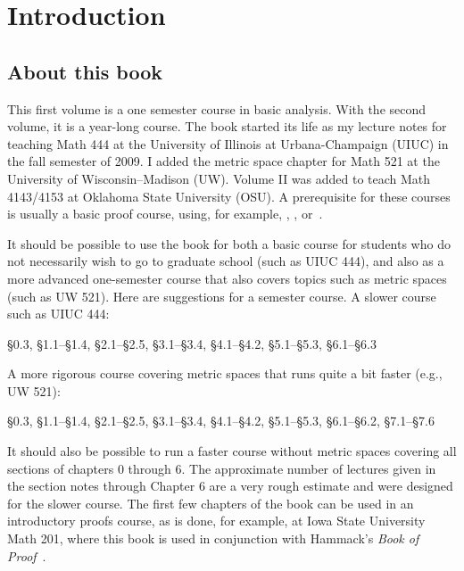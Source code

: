 \chapter*{Introduction}


\section{About this book}

\VolOneIntroExtrahead

This first volume is a one semester course in basic analysis.
With the second volume, it is a year-long course.
The book started its life
as my lecture notes for teaching Math 444 at the
University of Illinois at Urbana-Champaign (UIUC) in the fall semester of 2009.
I added the metric space chapter for Math 521 at the University of
Wisconsin--Madison (UW)\@.
Volume II was added to teach Math 4143/4153 at Oklahoma State University
(OSU)\@.
A prerequisite for these courses is usually a basic proof course,
using, for example, \cite{Hammack}, \cite{GIAM}, or~\cite{DW}.

It should be possible to use the book for
both a basic course for students who do not necessarily wish to
go to graduate school (such as UIUC 444), and also as a more advanced one-semester
course that also covers topics such as metric spaces (such as UW 521).
Here are suggestions for a semester course.
A slower course such as UIUC 444:
\begin{center}
\S0.3, \S1.1--\S1.4, \S2.1--\S2.5, \S3.1--\S3.4, \S4.1--\S4.2,
\S5.1--\S5.3, \S6.1--\S6.3
\end{center}
A more rigorous course covering metric spaces that runs quite a bit faster
(e.g., UW 521):
\begin{center}
\S0.3, \S1.1--\S1.4, \S2.1--\S2.5, \S3.1--\S3.4, \S4.1--\S4.2,
\S5.1--\S5.3, \S6.1--\S6.2, \S7.1--\S7.6
\end{center}
It should also be possible to run a faster course without metric spaces
covering all sections of chapters 0 through 6.  The approximate number of
lectures given in the section notes through Chapter 6 are a very rough
estimate and were designed for the slower course.
The first few chapters of the book can be used in an introductory proofs
course, as is done, for example, at Iowa State University Math 201, where
this book is used in conjunction with Hammack's \emph{Book of Proof}~\cite{Hammack}.

